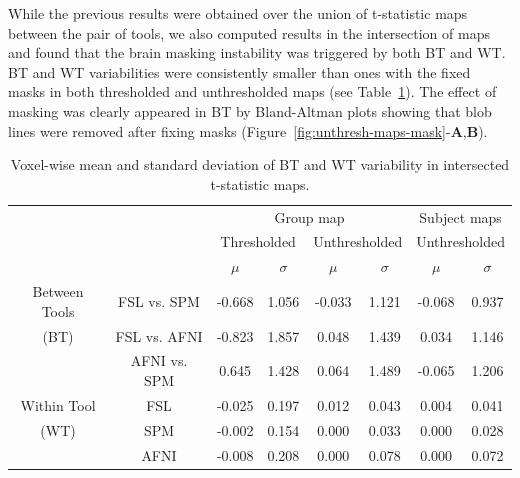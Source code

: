 \documentclass[11pt,onecolumn]{article}
\begin{document}
While the previous results were obtained over the union of t-statistic maps between the pair of tools,
we also computed results in the intersection of maps and found that the brain masking instability was
triggered by both BT and WT.
BT and WT variabilities were consistently smaller than ones with the fixed masks
in both thresholded and unthresholded maps (see Table~\ref{table:pipeline-stats-fixed-mask}).
The effect of masking was clearly appeared in BT by Bland-Altman plots showing that blob lines
were removed after fixing masks (Figure~\ref{fig:unthresh-maps-mask}-\textbf{A},\textbf{B}).

\setlength{\tabcolsep}{5pt}
\begin{table}[h]
  \centering
  \begin{tabular}{cccccc|cc}
    \toprule
                      &              & \multicolumn{4}{c|}{Group map}  & \multicolumn{2}{c}{Subject maps}                                                                     \\
    \multirow{2}{*}{} & {}           & \multicolumn{2}{c}{Thresholded} & \multicolumn{2}{c|}{Unthresholded} & \multicolumn{2}{c}{Unthresholded}                               \\
    {}                & {}           & $\mu$                           & $\sigma$                           & $\mu$                             & $\sigma$ & $\mu$ & $\sigma$ \\
    \midrule
    \rowcolor{lightgray!50}
    {Between Tools}   & FSL vs. SPM  & -0.668                           & 1.056                              & -0.033                             & 1.121    & -0.068 & 0.937    \\
    \rowcolor{lightgray!50}
    {(BT)}            & FSL vs. AFNI & -0.823                           & 1.857                              & 0.048                             & 1.439    & 0.034 & 1.146    \\
    \rowcolor{lightgray!50}
    {}                & AFNI vs. SPM & 0.645                           & 1.428                              & 0.064                             & 1.489    & -0.065 & 1.206    \\
    {Within Tool}     & FSL          & -0.025                           & 0.197                              & 0.012                             & 0.043    & 0.004 & 0.041    \\
    {(WT)}            & SPM          & -0.002                           & 0.154                              & 0.000                             & 0.033    & 0.000 & 0.028    \\
    {}                & AFNI         & -0.008                           & 0.208                              & 0.000                             & 0.078    & 0.000 & 0.072    \\
    \bottomrule
  \end{tabular}
  \caption{Voxel-wise mean and standard deviation of BT and WT variability in intersected t-statistic maps.}
  \label{table:pipeline-stats-fixed-mask}
\end{table}
\end{document}
